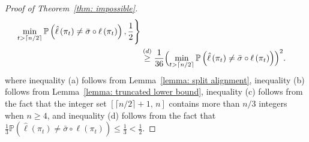 \documentclass[twoside,11pt]{article}
\theoremstyle{remark}
\begin{document}
\begin{proof}[Proof of Theorem~\ref{thm: impossible}]
\begin{equation}
\begin{aligned}
\min_{t > \lceil n/2 \rceil}\mathbb{P}\left(\hat{\ell}\left(\pi_{t}\right)\neq \bar{\sigma}\circ \ell\left(\pi_{t}\right)\right),
\frac{1}{2}
\Biggr\}\\
&\stackrel{(d)}{\geq} \frac{1}{36}
\Bigl(\min_{t > \lceil n/2 \rceil}\mathbb{P}\left(\hat{\ell}\left(\pi_{t}\right)\neq \bar{\sigma}\circ \ell\left(\pi_{t}\right)\right)\Bigr)^2.
\end{aligned}
\end{equation}
\endgroup
%
where inequality (a) follows from Lemma~\ref{lemma: split alignment}, inequality (b) follows from Lemma~\ref{lemma: truncated lower bound}, inequality (c) follows from the fact that the integer set
$[\lceil n/2\rceil+1,\, n]$ contains more than $n/3$ integers when $n \geq 4$, and
inequality (d) follows from the fact that $\frac{1}{3} \mathbb{P}\left(\hat{\ell}\left(\pi_{t}\right)\neq \bar{\sigma}\circ \ell\left(\pi_{t}\right)\right)\le \frac{1}{3}<\frac{1}{2}$.






\end{proof}
\end{document}
